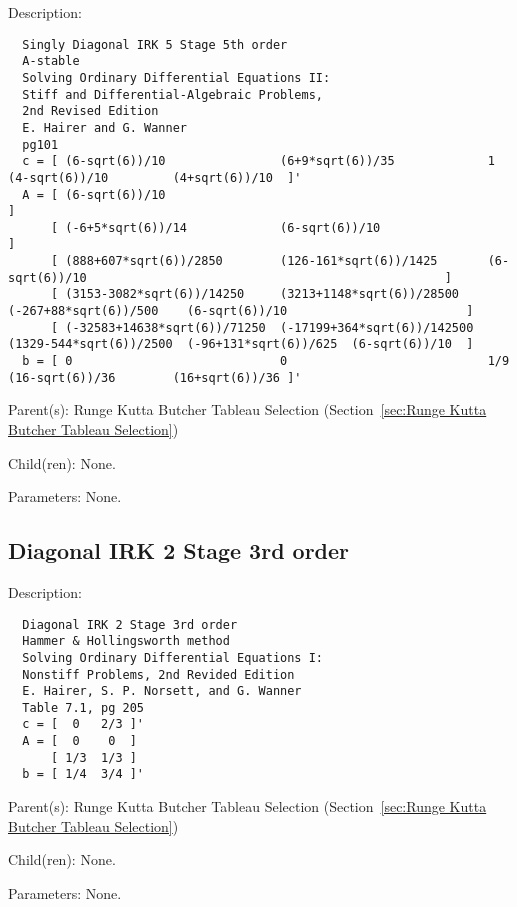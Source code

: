 \begin{list}{}
  {\setlength{\leftmargin}{1.0in}
   \setlength{\labelwidth}{0.75in}
   \setlength{\labelsep}{0.125in}}
  \item[Description:]
\begin{verbatim}
  Singly Diagonal IRK 5 Stage 5th order
  A-stable
  Solving Ordinary Differential Equations II:
  Stiff and Differential-Algebraic Problems,
  2nd Revised Edition
  E. Hairer and G. Wanner
  pg101
  c = [ (6-sqrt(6))/10                (6+9*sqrt(6))/35             1                        (4-sqrt(6))/10         (4+sqrt(6))/10  ]'
  A = [ (6-sqrt(6))/10                                                                                                             ]
      [ (-6+5*sqrt(6))/14             (6-sqrt(6))/10                                                                               ]
      [ (888+607*sqrt(6))/2850        (126-161*sqrt(6))/1425       (6-sqrt(6))/10                                                  ]
      [ (3153-3082*sqrt(6))/14250     (3213+1148*sqrt(6))/28500    (-267+88*sqrt(6))/500    (6-sqrt(6))/10                         ]
      [ (-32583+14638*sqrt(6))/71250  (-17199+364*sqrt(6))/142500  (1329-544*sqrt(6))/2500  (-96+131*sqrt(6))/625  (6-sqrt(6))/10  ]
  b = [ 0                             0                            1/9                      (16-sqrt(6))/36        (16+sqrt(6))/36 ]'
\end{verbatim}
  \item[Parent(s):]
    Runge Kutta Butcher Tableau Selection (Section~\ref{sec:Runge Kutta Butcher Tableau Selection})
  \item[Child(ren):]
    None. 
  \item[Parameters:]
    None. 
\end{list}

\subsection{Diagonal IRK 2 Stage 3rd order}
\label{sec:Diagonal IRK 2 Stage 3rd order}

\begin{list}{}
  {\setlength{\leftmargin}{1.0in}
   \setlength{\labelwidth}{0.75in}
   \setlength{\labelsep}{0.125in}}
  \item[Description:]
\begin{verbatim}
  Diagonal IRK 2 Stage 3rd order
  Hammer & Hollingsworth method
  Solving Ordinary Differential Equations I:
  Nonstiff Problems, 2nd Revided Edition
  E. Hairer, S. P. Norsett, and G. Wanner
  Table 7.1, pg 205
  c = [  0   2/3 ]'
  A = [  0    0  ]
      [ 1/3  1/3 ]
  b = [ 1/4  3/4 ]'
\end{verbatim}
  \item[Parent(s):]
    Runge Kutta Butcher Tableau Selection (Section~\ref{sec:Runge Kutta Butcher Tableau Selection})
  \item[Child(ren):]
    None. 
  \item[Parameters:]
    None. 
\end{list}


